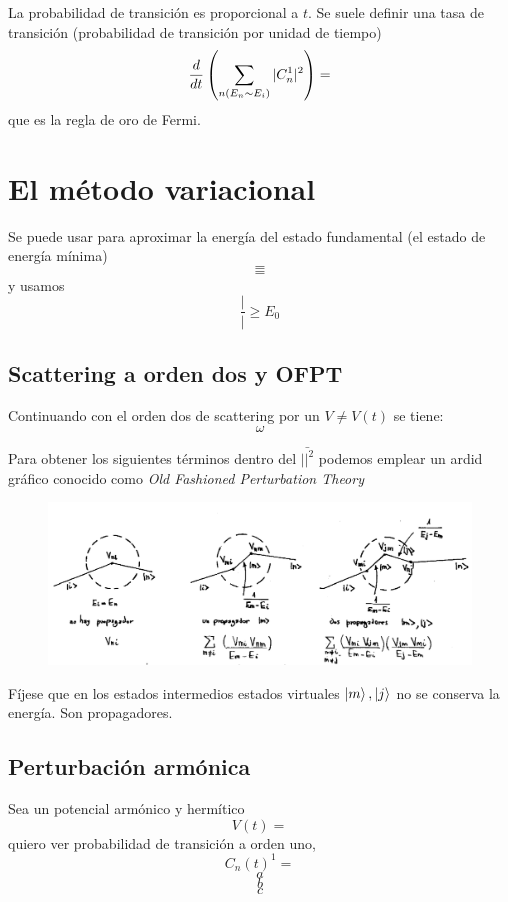 \documentclass[10pt,oneside]{CBFT_book}
\begin{document}
La probabilidad de transición es proporcional a $t$. Se suele definir una tasa de transición (probabilidad de 
transición por unidad de tiempo)
\[
	\frac{d^{\hspace{-0.05em}} {}}{d {t}^{\hspace{-0.05em}}}\left( \sum_{n(E_n\sim E_i)} |C_n^1|^2 \right) =
\]
que es la regla de oro de Fermi.

\section{El método variacional}

Se puede usar para aproximar la energía del estado fundamental (el estado de energía mínima)
\[
	=
\]
\[
	=
\]
y usamos 
\[
	\frac{|}{|} \geq E_0
\]

\subsection{Scattering a orden dos y OFPT}

Continuando con el orden dos de scattering por un $V\neq V(t)$ se tiene:
\[
	\omega
\]

Para obtener los siguientes términos dentro del $\bar{||^2}$ podemos emplear un ardid gráfico conocido como 
{\it Old Fashioned Perturbation Theory}

\begin{figure}[htb]
	\begin{center}
	\includegraphics[width=1.0\textwidth]{images/teo2_24.pdf}
	\end{center}
	\caption{}
\end{figure} 


Fíjese que en los estados intermedios estados virtuales $\Ket{m},\Ket{j}$ no se conserva la energía. Son 
propagadores.


\subsection{Perturbación armónica}

Sea un potencial armónico y hermítico 
\[
	V(t) =
\]
quiero ver probabilidad de transición a orden uno,
\[
	C_n(t)^1 = 
\]
\[
	a
\]
\[
	b
\]
\[
	c
\]
\end{document}
